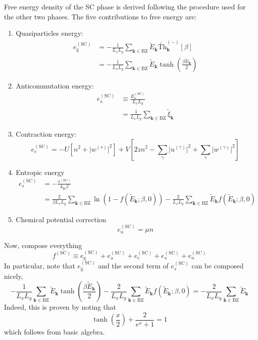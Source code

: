 \begin{tabproof}

	Free energy density of the SC phase is derived following the procedure used for the other two phases. The five contributions to free energy are:
	\begin{enumerate}
		\item Quasiparticles energy:
		\[
		\begin{aligned}
			e_\mathrm{g}^{(\mathrm{SC})} &= -\frac{1}{L_x L_y} \sum_{\mathbf{k} \in \mathrm{BZ}} \tilde{E}_\mathbf{k} \tilde{\mathrm{Th}}_\mathbf{k}^{(-)}[\beta] \\
			&= -\frac{1}{L_x L_y} \sum_{\mathbf{k} \in \mathrm{BZ}} \tilde{E}_\mathbf{k} \tanh(\frac{\beta \tilde{E}_\mathbf{k}}{2})
		\end{aligned}
		\]
		\item Anticommutation energy:
		\[
		\begin{aligned}
			e_\mathrm{a}^{(\mathrm{SC})} &\equiv \frac{E_\mathrm{a}^{(\mathrm{SC})}}{L_x L_y} \\
			&= \frac{1}{L_x L_y} \sum_{\mathbf{k} \in \mathrm{BZ}} \tilde{\xi}_\mathbf{k}
		\end{aligned}
		\]
		\item Contraction energy:
		\[
			e_\mathrm{c}^{(\mathrm{SC})} = -U \left[
				n^2 + \big|
					w^{(s)}
				\big|^2
			\right] + V \left[
				2zn^2 - \sum_\gamma \big|
					u^{(\gamma)}
				\big|^2 + \sum_\gamma \big|
					w^{(\gamma)}
				\big|^2
			\right]
		\]
		\item Entropic energy
		\[
		\begin{aligned}
			e_s^{(\mathrm{SC})} &= - \frac{s^{(\mathrm{SC})}}{k_\mathrm{B}\beta} \\
			&= \frac{2}{\beta L_x L_y} \sum_{\mathbf{k}\in\mathrm{BZ}} \ln \left(
				1- f( \tilde{E}_\mathbf{k}; \beta,0) 
			\right) - \frac{2}{L_x L_y} \sum_{\mathbf{k}\in\mathrm{BZ}} \tilde{E}_\mathbf{k} f(\tilde{E}_\mathbf{k}; \beta,0) 
		\end{aligned}
		\]
		\item Chemical potential correction
		\[
			e_n^{(\mathrm{SC})} = \mu n
		\]
	\end{enumerate}
	Now, compose everything
	\[
		f^{(\mathrm{SC})} \equiv e_\mathrm{g}^{(\mathrm{SC})} + e_\mathrm{a}^{(\mathrm{SC})} + e_\mathrm{c}^{(\mathrm{SC})} + e_s^{(\mathrm{SC})} + e_n^{(\mathrm{SC})}
	\]
	In particular, note that $e_\mathrm{g}^{(\mathrm{SC})}$ and the second term of $e_s^{(\mathrm{SC})}$ can be composed nicely,
	\[
		-\frac{1}{L_x L_y} \sum_{\mathbf{k} \in \mathrm{BZ}} \tilde{E}_\mathbf{k} \tanh(\frac{\beta \tilde{E}_\mathbf{k}}{2}) - \frac{2}{L_x L_y} \sum_{\mathbf{k}\in\mathrm{BZ}} \tilde{E}_\mathbf{k} f(\tilde{E}_\mathbf{k}; \beta,0) = - \frac{2}{L_x L_y} \sum_{\mathbf{k}\in\mathrm{BZ}} \tilde{E}_\mathbf{k}
	\]
	Indeed, this is proven by noting that
	\[
		\tanh(\frac{x}{2}) + \frac{2}{e^x + 1} = 1
	\]
	which follows from basic algebra.
	

\end{tabproof}
